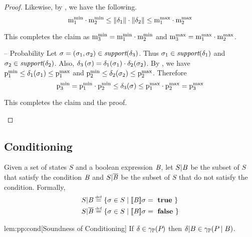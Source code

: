 \begin{proof}
Likewise, by , we have the following.
$$ \mathrm{m}^\mathrm{min}_{1} \cdot \mathrm{m}^\mathrm{min}_{2} \leq \mathord{\parallel}\delta_1\mathord{\parallel} \cdot \mathord{\parallel}\delta_2\mathord{\parallel} \leq \mathrm{m}^\mathrm{max}_{1} \cdot \mathrm{m}^\mathrm{max}_{2} $$

This completes the claim as $ \mathrm{m}^\mathrm{min}_{3} = \mathrm{m}^\mathrm{min}_{1} \cdot \mathrm{m}^\mathrm{min}_{2} $ and
$ \mathrm{m}^\mathrm{max}_{3} = \mathrm{m}^\mathrm{max}_{1} \cdot \mathrm{m}^\mathrm{max}_{2} $.

\begin{subproof}{ -- Probability}
Let $ \sigma = (\sigma_1, \sigma_2) \in \textit{support}(\delta_3) $. Thus
$ \sigma_1 \in \textit{support}(\delta_1) $ and
$ \sigma_2 \in \textit{support}(\delta_2) $. Also,
$ \delta_3\left( \sigma \right)
= \delta_1(\sigma_1) \cdot \delta_2(\sigma_2)
$. By , we have
$ \mathrm{p}^\mathrm{min}_{1} \leq \delta_1(\sigma_1) \leq \mathrm{p}^\mathrm{max}_{1} $ and
$ \mathrm{p}^\mathrm{min}_{2} \leq \delta_2(\sigma_2) \leq \mathrm{p}^\mathrm{max}_{2} $. Therefore
$$ \mathrm{p}^\mathrm{min}_{3}
= \mathrm{p}^\mathrm{min}_{1} \cdot \mathrm{p}^\mathrm{min}_{2} \leq \delta_3(\sigma) \leq \mathrm{p}^\mathrm{max}_{1} \cdot \mathrm{p}^\mathrm{max}_{2}
= \mathrm{p}^\mathrm{max}_{3} $$

This completes the claim and the proof.
\end{subproof}

\end{proof}

\subsection{Conditioning}

\newcommand{\scond}[2]{#1 | #2}
\newcommand{\scondc}[2]{#1 | \overline{#2}}

\begin{definition} Given a set of states $ S $ and a boolean
expression $ \mathit{B} $, let $ \scond{S}{\bexp} $ be the subset of $ S $
that satisfy the condition $ \mathit{B} $ and $ \scondc{S}{\bexp} $ be the
subset of $ S $ that do not satisfy the condition. Formally,
\begin{align*}
\scond{S}{\bexp} & \defeq \set{\sigma \in S \given \eeval{\bexp}{\sigma}
= \atrue} \\ 
\scondc{S}{\bexp} & \defeq \set{\sigma \in S \given \eeval{\bexp}{\sigma}
= \afalse} 
\end{align*}

\end{definition}

\begin{replemma}{lem:pp:cond}[Soundness of Conditioning] If $ \delta \in \gamma_{\mathbb{P}}(P_{}) $ then $
  \delta | B \in \gamma_{\mathbb{P}}(P_{} \mid B) $.
\end{replemma}

